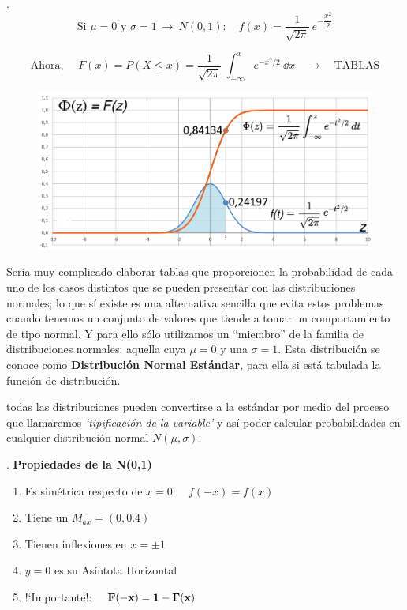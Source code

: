 \begin{definition}
.	$$ \text{Si } \mu=0 \text{ y } \sigma=1 \ \to \ N(0,1):\quad f(x)=\dfrac{1}{\sqrt{2\pi}} \ e^{-\dfrac{x^2}{2}}$$

$$\text{Ahora, } \quad F(x)=P(X\le x)=\dfrac{1}{\sqrt{2\pi}} \ \displaystyle \int_{-\infty}^x e^{-x^2/2}\ \dd x \quad \to \quad  \text{TABLAS}$$
\end{definition}

	\begin{figure}[H]
	\centering
	\includegraphics[width=.75\textwidth]{imagenes/imagenes04/T04IM14.png}
	\end{figure}

Sería muy complicado elaborar tablas que proporcionen la probabilidad de cada uno de los casos distintos que se pueden presentar con las distribuciones normales; lo que sí existe es una alternativa sencilla que evita estos problemas cuando tenemos un conjunto de valores que tiende a tomar un comportamiento de tipo normal. Y para ello sólo utilizamos un ``miembro'' de la familia de distribuciones normales: aquella cuya $\mu = 0$  y una $\sigma = 1$. Esta distribución se conoce como \textbf{Distribución Normal Estándar}, para ella si está tabulada la función de distribución. 

todas las distribuciones pueden convertirse a la estándar por medio del proceso que llamaremos \emph{`tipificación de la variable'} y así poder calcular probabilidades en cualquier distribución normal $N(\mu,\sigma)$.




\begin{theorem}
.	\textbf{Propiedades de la N(0,1)}	

\begin{enumerate}
\item Es simétrica respecto de $x=0: \quad f(-x)=f(x)$
\item Tiene un $M_{ax}=(0,0.4)$
\item Tienen inflexiones en $x=\pm 1$
\item $y=0$ es su Asíntota Horizontal
\item !`Importante!: $\quad \bold{F(-x)=1-F(x)}$	
\end{enumerate}

\end{theorem}

